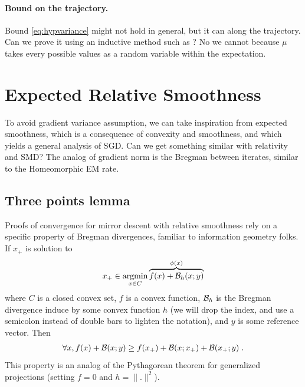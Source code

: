 \documentclass{article}
\begin{document}
\paragraph{Bound on the trajectory.}
Bound \eqref{eq:hypvariance} might not hold in general, but it can along the trajectory. Can we prove it using an inductive method such as \citet[Appendix A]{lacoste2012simpler}?
No we cannot because $\mu$ takes every possible values as a random variable within the expectation.

\section{Expected Relative Smoothness}
To avoid gradient variance assumption, we can take inspiration from expected smoothness, which is a consequence of convexity and smoothness, and which yields a general analysis of SGD. Can we get something similar with relativity and SMD? 
The analog of gradient norm is the Bregman between iterates, similar to the Homeomorphic EM rate. 



\subsection{Three points lemma}
\label{app:3points}

Proofs of convergence for mirror descent with relative smoothness rely on a specific property of Bregman divergences, familiar to information geometry folks. If $x_+$ is solution to 
\begin{align}
	x_+ \in \operatorname*{argmin}	_{x\in C} \overbrace{f(x) + {\mathcal B}_h(x ; y)}^{\phi(x)}
\end{align}
where $C$ is a closed convex set, $f$ is a convex function, ${\mathcal B}_h$ is the Bregman divergence induce by some convex function $h$ (we will drop the index, and use a semicolon instead of double bars to lighten the notation), and $y$ is some reference vector. Then 
\begin{align}
	\forall x, f(x) + {\mathcal B}(x ;y) \geq f(x_+) + {\mathcal B}(x ; x_+) +{\mathcal B}(x_+ ; y) \; .
\end{align}
This property is an analog of the Pythagorean theorem for generalized projections (setting $f=0$ and $h=\|.\|^2$).
\end{document}
